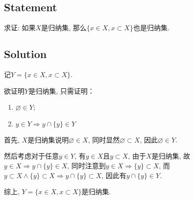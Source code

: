 \documentclass[UTF-8]{ctexart}
\begin{document}
\subsection{Statement}
求证: 如果$X$是归纳集, 那么$\{x \in X, x \subset X\}$也是归纳集.
\subsection{Solution}
记$Y = \{x \in X, x \subset X\}$.

欲证明$Y$是归纳集, 只需证明：
\begin{enumerate}
	\item $\varnothing \in Y$;
	\item $y \in Y \Rightarrow y \cap \{y\} \in Y$
\end{enumerate}

首先, $X$是归纳集说明$\varnothing \in X$, 同时显然$\varnothing \subset X$, 因此$\varnothing \in Y$.

然后考虑对于任意$y \in Y$, 有$y \in X$且$y \subset X$, 由于$X$是归纳集, 故$y \in X \Rightarrow y \cap \{y\} \in X$, 同时注意到$y \in X \Rightarrow \{y\} \subset X$, 而$y \subset X \wedge \{y\} \subset X \Rightarrow y \cap \{y\} \subset X$, 因此有$y \cap \{y\} \in Y$.

综上, $Y = \{x \in X, x \subset X\}$是归纳集.
\end{document}
